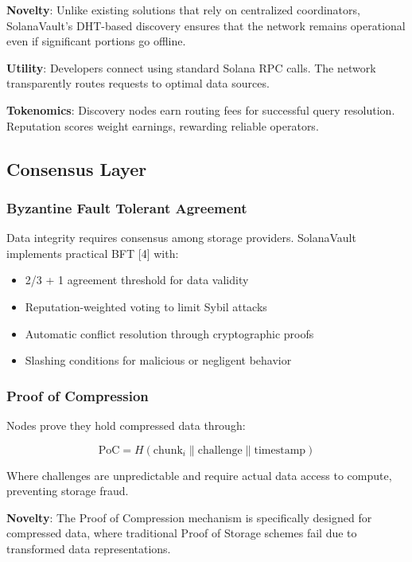 \documentclass[12pt,a4paper]{article}
\begin{document}
\noindent\textbf{Novelty}: Unlike existing solutions that rely on centralized coordinators, SolanaVault's DHT-based discovery ensures that the network remains operational even if significant portions go offline.

\noindent\textbf{Utility}: Developers connect using standard Solana RPC calls. The network transparently routes requests to optimal data sources.

\noindent\textbf{Tokenomics}: Discovery nodes earn routing fees for successful query resolution. Reputation scores weight earnings, rewarding reliable operators.

\subsection{Consensus Layer}

\subsubsection{Byzantine Fault Tolerant Agreement}

Data integrity requires consensus among storage providers. SolanaVault implements practical BFT [4] with:

\begin{itemize}
    \item 2/3 + 1 agreement threshold for data validity
    \item Reputation-weighted voting to limit Sybil attacks
    \item Automatic conflict resolution through cryptographic proofs
    \item Slashing conditions for malicious or negligent behavior
\end{itemize}

\subsubsection{Proof of Compression}

Nodes prove they hold compressed data through:

\begin{equation}
\text{PoC} = H(\text{chunk}_i \| \text{challenge} \| \text{timestamp})
\end{equation}

Where challenges are unpredictable and require actual data access to compute, preventing storage fraud.

\noindent\textbf{Novelty}: The Proof of Compression mechanism is specifically designed for compressed data, where traditional Proof of Storage schemes fail due to transformed data representations.
\end{document}
